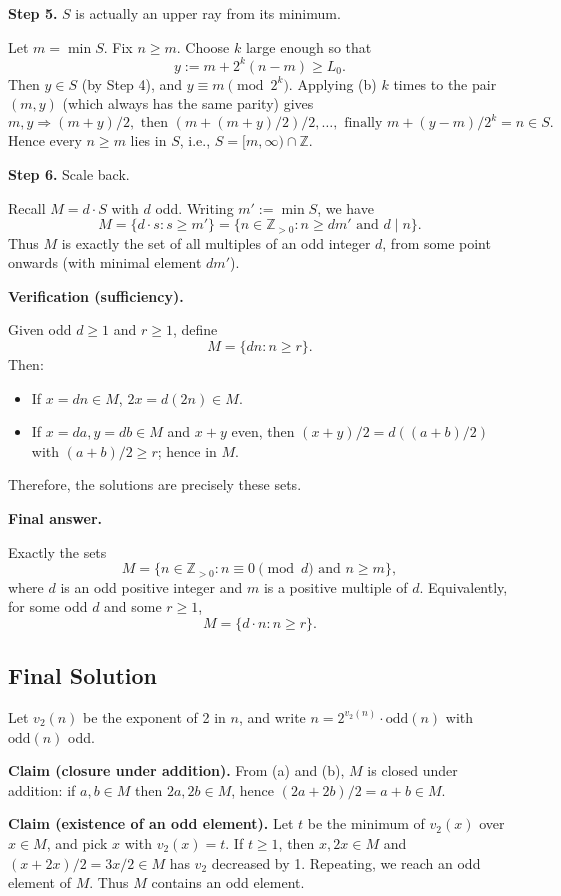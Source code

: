 \documentclass[12pt,a4paper]{article}
\theoremstyle{definition}
\begin{document}
    \textbf{Step 5.} $S$ is actually an upper ray from its minimum.

    Let $m = \min S$. Fix $n \geq m$. Choose $k$ large enough so that
    $$y := m + 2^k (n - m) \geq L_0.$$
    Then $y \in S$ (by Step 4), and $y \equiv m \pmod{2^k}$. Applying (b) $k$ times to the pair $(m, y)$ (which always has the same parity) gives
    $$m, y \Rightarrow (m+y)/2, \text{ then } (m + (m+y)/2)/2, \ldots, \text{ finally } m + (y-m)/2^k = n \in S.$$
    Hence every $n \geq m$ lies in $S$, i.e., $S = [m, \infty) \cap \mathbb{Z}$.

    \textbf{Step 6.} Scale back.

    Recall $M = d \cdot S$ with $d$ odd. Writing $m' := \min S$, we have
    $$M = \{d \cdot s : s \geq m'\} = \{n \in \mathbb{Z}_{>0} : n \geq d m' \text{ and } d \mid n\}.$$
    Thus $M$ is exactly the set of all multiples of an odd integer $d$, from some point onwards (with minimal element $dm'$).

    \textbf{Verification (sufficiency).}

    Given odd $d \geq 1$ and $r \geq 1$, define
    $$M = \{dn : n \geq r\}.$$
    Then:
    \begin{itemize}
        \item If $x = dn \in M$, $2x = d(2n) \in M$.
        \item If $x = da, y = db \in M$ and $x+y$ even, then $(x+y)/2 = d((a+b)/2)$ with $(a+b)/2 \geq r$; hence in $M$.
    \end{itemize}

    Therefore, the solutions are precisely these sets.

    \textbf{Final answer.}

    Exactly the sets
    $$M = \{n \in \mathbb{Z}_{>0} : n \equiv 0 \pmod{d} \text{ and } n \geq m\},$$
    where $d$ is an odd positive integer and $m$ is a positive multiple of $d$. Equivalently, for some odd $d$ and some $r \geq 1$,
    $$M = \{d \cdot n : n \geq r\}.$$
    \subsection{Final Solution}
    Let $v_2(n)$ be the exponent of 2 in $n$, and write $n = 2^{v_2(n)} \cdot \text{odd}(n)$ with $\text{odd}(n)$ odd.

    \textbf{Claim (closure under addition).} From (a) and (b), $M$ is closed under addition: if $a,b \in M$ then $2a,2b \in M$, hence $(2a+2b)/2 = a+b \in M$.

    \textbf{Claim (existence of an odd element).} Let $t$ be the minimum of $v_2(x)$ over $x \in M$, and pick $x$ with $v_2(x)=t$. If $t\geq 1$, then $x,2x \in M$ and $(x+2x)/2 = 3x/2 \in M$ has $v_2$ decreased by 1. Repeating, we reach an odd element of $M$. Thus $M$ contains an odd element.
\end{document}
